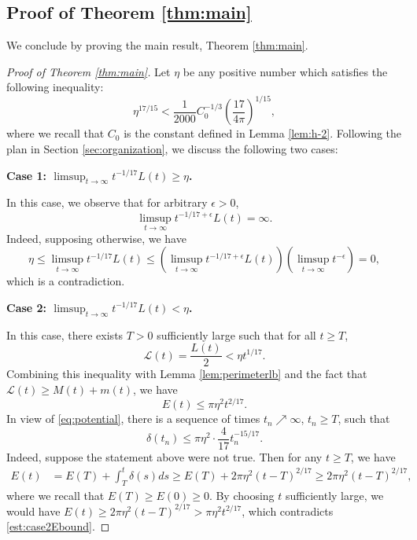 \documentclass[11pt]{article}
\numberwithin{equation}{section}
\newcommand{\eps}{\epsilon}
\newcommand{\calL}{\mathcal{L}}
\begin{document}
\subsection{Proof of Theorem \ref{thm:main}}
We conclude by proving the main result, Theorem \ref{thm:main}.
\begin{proof}[Proof of Theorem \ref{thm:main}]
    Let $\eta$ be any positive number which satisfies the following inequality:
    $$
    \eta^{{17/15}} < \frac{1}{2000}C_0^{-1/3}\left(\frac{17}{4\pi}\right)^{1/15},
    $$
    where we recall that $C_0$ is the constant defined in Lemma \ref{lem:h-2}.
    Following the plan in Section \ref{sec:organization}, we discuss the following two cases:
    
    \noindent\textbf{Case 1: $\limsup_{t\to\infty}t^{-1/17}L(t) \ge \eta$.} 
    
    In this case, we observe that for arbitrary $\eps > 0$,
    \begin{equation}
        \label{est:mainaux1}
        \limsup_{t\to\infty}t^{-1/17 +\eps} L(t) = \infty.
    \end{equation}
    Indeed, supposing otherwise, we have
    $$
   \eta \le \limsup_{t\to\infty}t^{-1/17}L(t) \le \left(\limsup_{t\to\infty} t^{-1/17+\eps}L(t)\right)\left(\limsup_{t\to\infty} t^{-\eps}\right) = 0,
    $$
    which is a contradiction.

    \noindent\textbf{Case 2: $\limsup_{t\to\infty}t^{-1/17}L(t) < \eta$.} 

    In this case, there exists $T > 0$ sufficiently large such that for all $t \ge T$, 
    \begin{equation}\label{est:case2Lbound}
    \calL(t) = \frac{L(t)}{2} < \eta t^{1/17}.
    \end{equation}
    Combining this inequality with Lemma \ref{lem:perimeterlb} and the fact that $\calL(t) \ge M(t) + m(t)$, we have
    \begin{equation}\label{est:case2Ebound}
    E(t) \le \pi\eta^2 t^{2/17}.
    \end{equation}
    In view of \eqref{eq:potential}, there is a sequence of times $t_n \nearrow \infty$, $t_n \ge T$, such that
    \begin{equation}\label{est:case2deltabound}
    \delta(t_n) \le \pi\eta^2\cdot \frac{4}{17}t_n^{-15/17}.
    \end{equation}
    Indeed, suppose the statement above were not true. Then for any $t \ge T$, we have
    \begin{align*}
        E(t) &= E(T) + \int_T^t \delta(s) ds \ge E(T) + 2\pi\eta^2 (t-T)^{2/17} \ge 2\pi\eta^2 (t-T)^{2/17},
    \end{align*}
    where we recall that $E(T) \ge E(0) \ge 0$. By choosing $t$ sufficiently large, we would have $E(t) \ge 2\pi\eta^2 (t-T)^{2/17} > \pi\eta^2 t^{2/17}$, which contradicts \eqref{est:case2Ebound}.
    

\end{proof}
\end{document}
